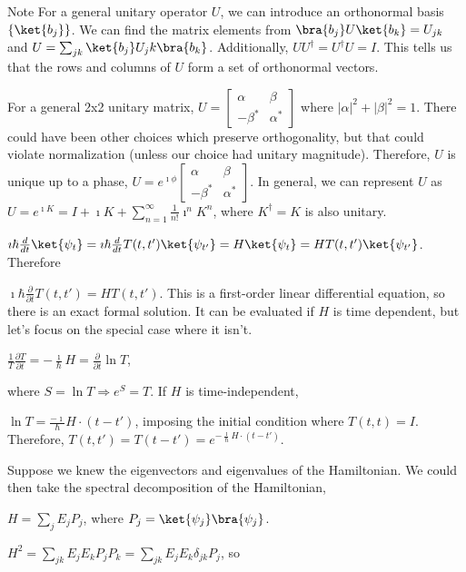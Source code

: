 \documentclass[a4paper,twoside,master.tex]{subfiles}
\begin{document}
\begin{note}{Note}
For a general unitary operator $U$, we can introduce an orthonormal
basis $\{\ket{b_j}\}$. We can find the matrix elements from
$\bra{ b_j}U\ket{b_k} = U_{jk}$ and
$U = \sum_{jk}\ket{b_j} U_jk\bra{ b_k}$. Additionally,
$UU^\dagger = U^\dagger U = I$. This tells us that the rows and
columns of $U$ form a set of orthonormal vectors.

For a general 2x2 unitary matrix,
$U=\begin{bmatrix}\alpha&\beta\\-\beta^*&\alpha^*\end{bmatrix}$ where
$|\alpha|^2 + |\beta|^2 = 1$. There could have been other choices
which preserve orthogonality, but that could violate normalization
(unless our choice had unitary magnitude). Therefore, $U$ is unique up
to a phase,
$U=e^{\imath\phi}\begin{bmatrix}\alpha&\beta\\-\beta^*&\alpha^*\end{bmatrix}$.
In general, we can represent $U$ as
$U=e^{\imath K}= I + \imath K + \sum_{n=1}^\infty\frac{1}{n!}\imath^nK^n $,
where $K^\dagger = K$ is also unitary.
\end{note}

$\imath\hbar\frac{d}{dt}\ket{\psi_t} = \imath\hbar\frac{d}{dt}T(t,t')\ket{\psi_{t'}} = H\ket{\psi_t} = HT(t,t')\ket{\psi_{t'}}$.
Therefore

$\imath\hbar\frac{\partial}{\partial t}T(t,t') = HT(t,t')$. This is a
first-order linear differential equation, so there is an exact formal
solution. It can be evaluated if $H$ is time dependent, but let's
focus on the special case where it isn't.

$\frac{1}{T}\frac{\partial T}{\partial t} = -\frac{\imath}{\hbar}H = \frac{\partial}{\partial t}\ln T$,

where $S=\ln T\Rightarrow e^S = T$. If $H$ is time-independent,

$\ln T = \frac{-\imath}{\hbar}H\cdot(t-t')$, imposing the initial
condition where $T(t,t) = I$. Therefore,
$T(t,t') = T(t-t') = e^{-\frac{\imath}{\hbar}H\cdot(t-t')}$.

Suppose we knew the eigenvectors and eigenvalues of the Hamiltonian. We
could then take the spectral decomposition of the Hamiltonian,

$H = \sum_j E_j P_j$, where $P_j = \ket{\psi_j}\bra{\psi_j}$.

$H^2 = \sum_{jk}E_jE_kP_jP_k = \sum_{jk}E_jE_k\delta_{jk}P_j$, so
\end{document}
